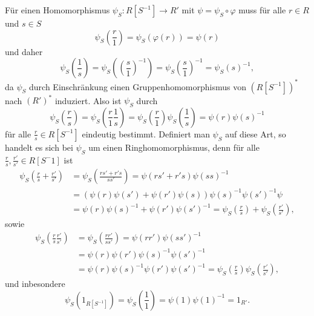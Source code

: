 \documentclass[a4paper,10pt]{article}
\theoremstyle{definition}
\begin{document}
Für einen Homomorphismus $\psi_S : R[S^{-1}] \rightarrow R'$ mit $\psi = \psi_S \circ \varphi$ muss für alle $r \in R$ und $s \in S$
\[
 \psi_S\left(\frac{r}{1}\right)
 = \psi_S( \varphi(r) )
 = \psi(r)
\]
und daher
\[
 \psi_S\left(\frac{1}{s}\right)
 = \psi_S\left( \left (\frac{s}{1} \right)^{-1} \right)
 = \psi_S\left( \frac{s}{1} \right)^{-1}
 = \psi_S(s)^{-1},
\]
da $\psi_S$ durch Einschränkung einen Gruppenhomomorphismus von $(R[S^{-1}])^*$ nach $(R')^*$ induziert. Also ist $\psi_S$ durch
\[
 \psi_S\left(\frac{r}{s}\right)
 = \psi_S\left(\frac{r}{1} \frac{1}{s}\right)
 = \psi_S\left(\frac{r}{1}\right) \psi_S\left(\frac{1}{s}\right)
 = \psi(r)\psi(s)^{-1}
\]
für alle $\frac{r}{s} \in R[S^{-1}]$ eindeutig bestimmt. Definiert man $\psi_S$ auf diese Art, so handelt es sich bei $\psi_S$ um einen Ringhomomorphismus, denn für alle $\frac{r}{s}, \frac{r'}{s'} \in R[S^-1]$ ist
\begin{align*}
 \psi_S\left( \frac{r}{s} + \frac{r'}{s'} \right)
 &= \psi_S\left( \frac{rs' + r's}{ss'} \right)
 = \psi(rs' + r's)\psi(ss)^{-1} \\
 &= \left( \psi(r)\psi(s') + \psi(r')\psi(s) \right) \psi(s)^{-1}\psi(s')^{-1} \psi \\
 &= \psi(r)\psi(s)^{-1} + \psi(r')\psi(s')^{-1}
 = \psi_S\left(\frac{r}{s}\right) + \psi_S\left(\frac{r'}{s'}\right),
\end{align*}
sowie
\begin{align*}
 \psi_S\left(\frac{r}{s} \frac{r'}{s'}\right)
 &= \psi_S\left(\frac{rr'}{ss'}\right)
 = \psi(rr')\psi(ss')^{-1} \\
 &= \psi(r)\psi(r')\psi(s)^{-1}\psi(s')^{-1} \\
 &= \psi(r)\psi(s)^{-1} \psi(r')\psi(s')^{-1}
 = \psi_S\left(\frac{r}{s}\right) \psi_S\left(\frac{r'}{s'}\right),
\end{align*}
und inbesondere
\[
 \psi_S\left(1_{R[S^{-1}]}\right)
 = \psi_S\left(\frac{1}{1}\right)
 = \psi(1) \psi(1)^{-1}
 = 1_{R'}.
\]
\end{document}

